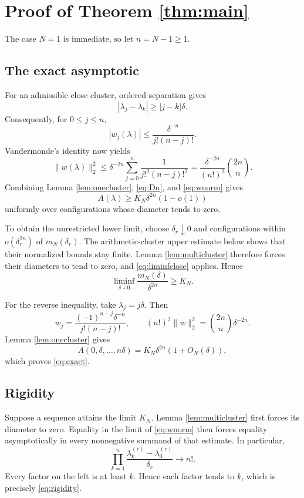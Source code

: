 \documentclass[11pt]{article}
\begin{document}
\section{Proof of Theorem \ref{thm:main}}

The case $N=1$ is immediate, so let $n=N-1\geq1$.

\subsection*{The exact asymptotic}

For an admissible close cluster, ordered separation gives
\[
 |\lambda_j-\lambda_k|\geq |j-k|\delta.
\]
Consequently, for $0\leq j\leq n$,
\begin{equation}\label{eq:barybound}
 |w_j(\lambda)|
 \leq\frac{\delta^{-n}}{j!(n-j)!}.
\end{equation}
Vandermonde's identity now yields
\begin{equation}\label{eq:wnorm}
 \|w(\lambda)\|_2^2
 \leq \delta^{-2n}\sum_{j=0}^{n}\frac{1}{j!^2(n-j)!^2}
 =\frac{\delta^{-2n}}{(n!)^2}\binom{2n}{n}.
\end{equation}
Combining Lemma \ref{lem:onecluster}, \eqref{eq:Dn}, and \eqref{eq:wnorm} gives
\begin{equation}\label{eq:liminfclose}
 A(\lambda)\geq
 K_N\delta^{2n}(1-o(1))
\end{equation}
uniformly over configurations whose diameter tends to zero.

To obtain the unrestricted lower limit, choose $\delta_r\downarrow0$ and configurations within $o(\delta_r^{2n})$ of $m_N(\delta_r)$.  The arithmetic-cluster upper estimate below shows that their normalized bounds stay finite.  Lemma \ref{lem:multicluster} therefore forces their diameters to tend to zero, and \eqref{eq:liminfclose} applies.  Hence
\[
 \liminf_{\delta\downarrow0}\frac{m_N(\delta)}{\delta^{2n}}\geq K_N.
\]

For the reverse inequality, take $\lambda_j=j\delta$.  Then
\[
 w_j=\frac{(-1)^{n-j}\delta^{-n}}{j!(n-j)!},\qquad
 (n!)^2\|w\|_2^2=\binom{2n}{n}\delta^{-2n}.
\]
Lemma \ref{lem:onecluster} gives
\[
 A(0,\delta,\ldots,n\delta)
 =K_N\delta^{2n}(1+O_N(\delta)),
\]
which proves \eqref{eq:exact}.

\subsection*{Rigidity}

Suppose a sequence attains the limit $K_N$.  Lemma \ref{lem:multicluster} first forces its diameter to zero.  Equality in the limit of \eqref{eq:wnorm} then forces equality asymptotically in every nonnegative summand of that estimate.  In particular,
\[
 \prod_{k=1}^{n}\frac{\lambda_k^{(r)}-\lambda_0^{(r)}}{\delta_r}
 \longrightarrow n!.
\]
Every factor on the left is at least $k$.  Hence each factor tends to $k$, which is precisely \eqref{eq:rigidity}.
\end{document}
